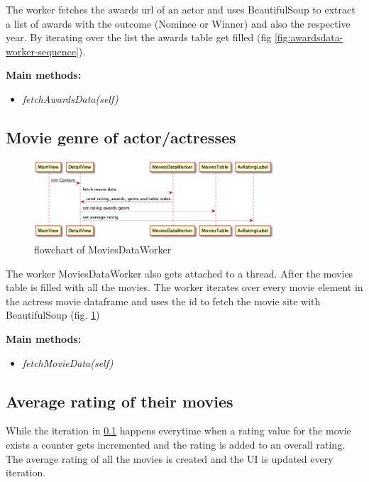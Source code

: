 \documentclass[12pt]{article}
\begin{document}
The worker fetches the awards url
of an actor and uses BeautifulSoup to extract a list of awards with the 
outcome (Nominee or Winner) and also the respective year. By iterating over 
the list the awards table get filled (fig \ref{fig:awardsdata-worker-sequence}).

\textbf{Main methods:}
\begin{itemize}
      \item \textit{fetchAwardsData(self)}
\end{itemize}

\subsection{Movie genre of actor/actresses} \label{genre}
\begin{figure}[H]
      \centering
      \includegraphics[width=0.8\textwidth]{img/movies-data-worker-sequence.png}
      \caption{\label{fig:movies-data-worker-sequence} flowchart of MoviesDataWorker}
\end{figure}

The worker MoviesDataWorker also gets attached to a thread. After the movies table 
is filled with all the movies. The worker iterates over every movie element in the 
actress movie dataframe and uses the id to fetch the movie site with BeautifulSoup (fig. \ref{fig:movies-data-worker-sequence})

\textbf{Main methods:}
\begin{itemize}
      \item \textit{fetchMovieData(self)}
\end{itemize}

\subsection{Average rating of their movies} \label{average-rating}
While the iteration in \ref{genre} happens everytime when a rating value for the movie exists
a counter gets incremented and the rating is added to an overall rating. The average rating of all
the movies is created and the UI is updated every iteration.
\end{document}
